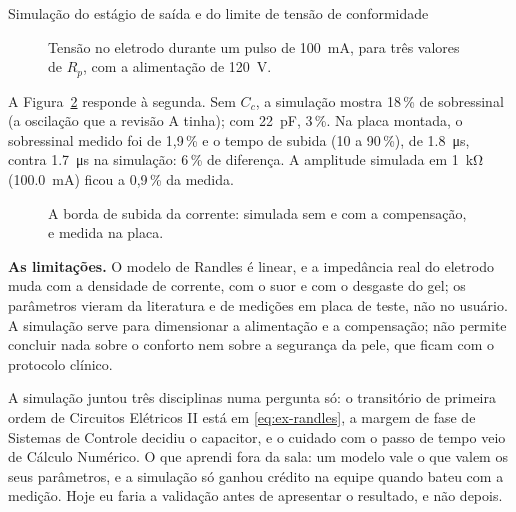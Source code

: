\begin{atividade}{Simulação do estágio de saída e do limite de tensão de conformidade}
\begin{resultados}
\begin{figure}[htbp]
  \centering
  
  \caption{Tensão no eletrodo durante um pulso de \SI{100}{\milli\ampere}, para três valores de $R_p$,
    com a alimentação de \SI{120}{\volt}.}
  \label{fig:ex-tensao}
\end{figure}

A Figura~\ref{fig:ex-borda} responde à segunda. Sem $C_c$, a simulação mostra 18\,\% de sobressinal
(a oscilação que a revisão A tinha); com \SI{22}{\pico\farad}, 3\,\%. Na placa montada, o sobressinal
medido foi de 1,9\,\% e o tempo de subida (10 a 90\,\%), de \SI{1,8}{\micro\second}, contra
\SI{1,7}{\micro\second} na simulação: 6\,\% de diferença. A amplitude simulada em \SI{1}{\kilo\ohm}
(\SI{100,0}{\milli\ampere}) ficou a 0,9\,\% da medida.

\begin{figure}[htbp]
  \centering
  
  \caption{A borda de subida da corrente: simulada sem e com a compensação, e medida na placa.}
  \label{fig:ex-borda}
\end{figure}

\textbf{As limitações.} O modelo de Randles é linear, e a impedância real do eletrodo muda com a
densidade de corrente, com o suor e com o desgaste do gel; os parâmetros vieram da literatura e de
medições em placa de teste, não no usuário. A simulação serve para dimensionar a alimentação e a
compensação; não permite concluir nada sobre o conforto nem sobre a segurança da pele, que ficam com o
protocolo clínico.
\end{resultados}

\begin{evidencias}
\end{evidencias}

\begin{aprendizados}
A simulação juntou três disciplinas numa pergunta só: o transitório de primeira ordem de Circuitos
Elétricos II está em \eqref{eq:ex-randles}, a margem de fase de Sistemas de Controle decidiu o
capacitor, e o cuidado com o passo de tempo veio de Cálculo Numérico. O que aprendi fora da sala: um
modelo vale o que valem os seus parâmetros, e a simulação só ganhou crédito na equipe quando bateu com
a medição. Hoje eu faria a validação antes de apresentar o resultado, e não depois.
\end{aprendizados}
\end{atividade}

